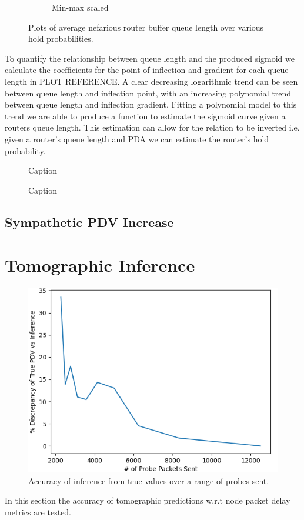 \begin{figure}[H]
\begin{subfigure}{0.475\textwidth}
        \caption{Min-max scaled}
    \end{subfigure}
    \caption{Plots of average nefarious router buffer queue length over various hold probabilities.}
    \label{fig:Rvariedqlenpda}
\end{figure}
To quantify the relationship between queue length and the produced sigmoid we calculate the coefficients for the point of inflection and gradient for each queue length in PLOT REFERENCE. A clear decreasing logarithmic trend can be seen between queue length and inflection point, with an increasing polynomial trend between queue length and inflection gradient. Fitting a polynomial model to this trend we are able to produce a function to estimate the sigmoid curve given a routers queue length. This estimation can allow for the relation to be inverted i.e. given a router's queue length and PDA we can estimate the router's hold probability.
\begin{figure}[H]
    \centering
    \caption{Caption}
    \label{fig:Rsigmoidcoefs}
\end{figure}

\begin{figure}[H]
    \centering
    \caption{Caption}
    \label{fig:Rvariedqlenpdv}
\end{figure}

\subsection{Sympathetic PDV Increase}
\label{ssec:Rsympathicpdv}

\section{Tomographic Inference}
\begin{figure}[H]
        \centering
        \includegraphics[width=\textwidth]{figs/results/Probe_PDV_accuracy_plot.png}
        \caption{Accuracy of inference from true values over a range of probes sent.}
        \label{fig:Rqstabilization}
\end{figure}
In this section the accuracy of tomographic predictions w.r.t node packet delay metrics are tested.


